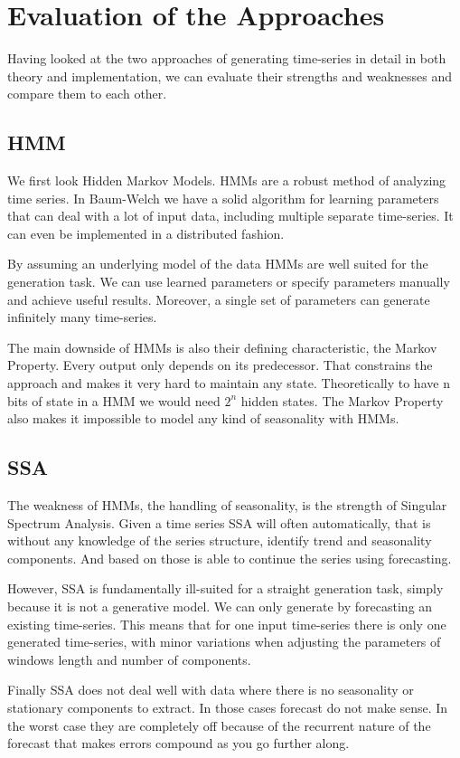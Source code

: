 
\chapter{Evaluation of the Approaches}\label{chapter:evaluation}

Having looked at the two approaches of generating time-series in detail in both theory and implementation, we can evaluate their strengths and weaknesses and compare them to each other. 

\section{HMM}

We first look Hidden Markov Models. HMMs are a robust method of analyzing time series. In Baum-Welch we have a solid algorithm for learning parameters that can deal with a lot of input data, including multiple separate time-series. It can even be implemented in a distributed fashion. 

By assuming an underlying model of the data HMMs are well suited for the generation task. We can use learned parameters or specify parameters manually and achieve useful results. Moreover, a single set of parameters can generate infinitely many time-series. 

The main downside of HMMs is also their defining characteristic, the Markov Property. Every output only depends on its predecessor. That constrains the approach and makes it very hard to maintain any state. Theoretically to have n bits of state in a HMM we would need $2^n$ hidden states. The Markov Property also makes it impossible to model any kind of seasonality with HMMs. 

\section{SSA}

The weakness of HMMs, the handling of seasonality, is the strength of Singular Spectrum Analysis. Given a time series SSA will often automatically, that is without any knowledge of the series structure, identify trend and seasonality components. And based on those is able to continue the series using forecasting.

However, SSA is fundamentally ill-suited for a straight generation task, simply because it is not a generative model. We can only generate by forecasting an existing time-series. This means that for one input time-series there is only one generated time-series, with minor variations when adjusting the parameters of windows length and number of components.

Finally SSA does not deal well with data where there is no seasonality or stationary components to extract. In those cases forecast do not make sense. In the worst case they are completely off because of the recurrent nature of the forecast that makes errors compound as you go further along.